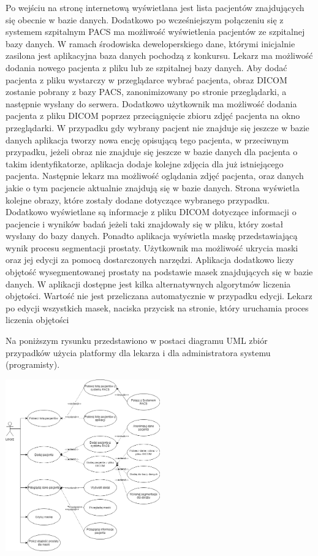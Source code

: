 \documentclass[a4paper,11pt,twoside]{report}
\theoremstyle{definition}
\begin{document}
Po wejściu na stronę internetową wyświetlana jest lista pacjentów znajdujących się obecnie w bazie danych. Dodatkowo po wcześniejszym połączeniu się z systemem szpitalnym PACS ma możliwość wyświetlenia pacjentów ze szpitalnej bazy danych. W ramach środowiska deweloperskiego dane, którymi inicjalnie zasilona jest aplikacyjna baza danych pochodzą z konkursu. \cite{konkurs}
Lekarz ma możliwość dodania nowego pacjenta z pliku lub ze szpitalnej bazy danych. Aby dodać pacjenta z pliku wystarczy w przeglądarce wybrać pacjenta, obraz DICOM zostanie pobrany z bazy PACS, zanonimizowany po stronie przeglądarki, a następnie wysłany do serwera. Dodatkowo użytkownik ma możliwość dodania pacjenta z pliku DICOM poprzez przeciągnięcie zbioru zdjęć pacjenta na okno przeglądarki. W przypadku gdy wybrany pacjent nie znajduje się jeszcze w bazie danych aplikacja tworzy nowa encję opisującą tego pacjenta, w przeciwnym przypadku, jeżeli obraz nie znajduje się jeszcze w bazie danych dla pacjenta o takim identyfikatorze, aplikacja dodaje kolejne zdjęcia dla już istniejącego pacjenta.
Następnie lekarz ma możliwość oglądania zdjęć pacjenta, oraz danych jakie o tym pacjencie aktualnie znajdują się w bazie danych. Strona wyświetla kolejne obrazy, które zostały dodane dotyczące wybranego przypadku. Dodatkowo wyświetlane są informacje z pliku DICOM dotyczące informacji o pacjencie i wyników badań jeżeli taki znajdowały się w pliku, który  został wysłany do bazy danych. Ponadto aplikacja wyświetla maskę przedstawiającą wynik procesu segmentacji prostaty. Użytkownik ma możliwość ukrycia maski oraz jej edycji za pomocą dostarczonych narzędzi. 
Aplikacja dodatkowo liczy objętość wysegmentowanej prostaty na podstawie masek znajdujących się w bazie danych. W aplikacji dostępne jest kilka alternatywnych algorytmów liczenia objętości. Wartość nie jest przeliczana automatycznie w przypadku edycji. Lekarz po edycji wszystkich masek, naciska przycisk na stronie, który uruchamia proces liczenia objętości 
\par
Na poniższym rysunku przedstawiono w postaci diagramu UML zbiór przypadków użycia platformy dla lekarza i dla administratora systemu (programisty).
\par
\begin{minipage}{\linewidth}
	\centering
	\includegraphics[width=0.5\textwidth]{useCase.png}
\end{minipage}
\par
\end{document}

